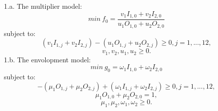 \documentclass{article}
\begin{document}
1.a.
The multiplier model:
$$ min\ f_0 = \frac{v_1 I_{1,0} + v_2 I_{2,0}}{u_1 O_{1,0} + u_2 O_{2,0}} $$
subject to:
$$ (v_1 I_{1,j} + v_2 I_{2,j}) - (u_1 O_{1,j} + u_2 O_{2,j}) \geq 0, j = 1, ..., 12, $$
$$ v_1, v_2, u_1, u_2 \geq 0. $$
1.b.
The envolopment model:
$$ min\ g_0 = \omega_1 I_{1,0} + \omega_2 I_{2,0} $$
subject to:
$$ - (\mu_1 O_{1,j} + \mu_2 O_{2,j}) + (\omega_1 I_{1,j} + \omega_2 I_{2,j}) \geq 0, j = 1, ..., 12, $$
$$ \mu_1 O_{1,0} + \mu_2 O_{2,0} = 1, $$
$$ \mu_1, \mu_2, \omega_1, \omega_2 \geq 0. $$
\end{document}
